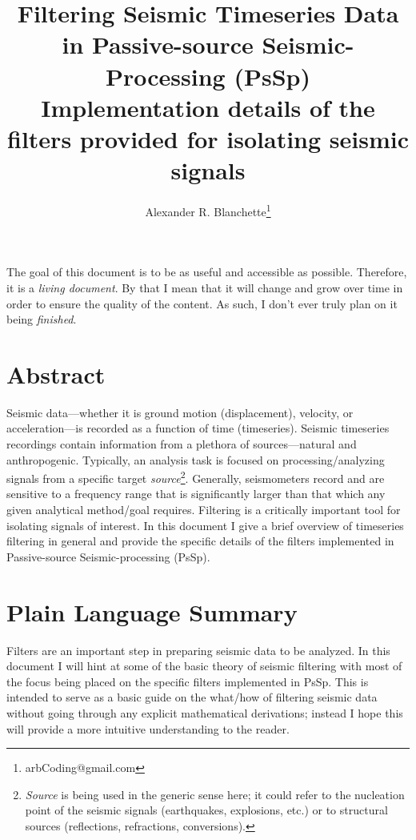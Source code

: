 \documentclass[american, twoside]{article}
\title{\Huge Filtering Seismic Timeseries Data in Passive-source Seismic-Processing (PsSp)\\
\large Implementation details of the filters provided for isolating seismic signals}
\author{Alexander R. Blanchette\thanks{arbCoding@gmail.com}}
\date{\Today}
\begin{document}
\maketitle
\pagestyle{fancy}
\scriptsize The goal of this document is to be as useful and accessible as possible. Therefore, it is a \textit{living document}. By that I mean
that it will change and grow over time in order to ensure the quality of the content. As such, I don't ever truly plan on it being
\textit{finished}.
\normalsize

\begin{tcolorbox}[enhanced]
    \section*{Abstract} \label{Abstract}
    Seismic data---whether it is ground motion (displacement), velocity, or acceleration---is recorded as a function of time (timeseries). Seismic timeseries
    recordings contain information from a plethora of sources---natural and anthropogenic. Typically, an analysis task is focused on processing/analyzing
    signals from a specific target \textit{source}\footnote{\textit{Source} is being used in the generic sense here; it could refer to the nucleation point of the seismic
    signals (earthquakes, explosions, etc.) or to structural sources (reflections, refractions, conversions).}. Generally, seismometers record and are sensitive
    to a frequency range that is significantly larger than that which any given analytical method/goal requires. Filtering is a critically important tool for
    isolating signals of interest. In this document I give a brief overview of timeseries filtering in general and provide the specific details of the filters
    implemented in Passive-source Seismic-processing (PsSp).
    \section*{Plain Language Summary} \label{PlainSummary}
    Filters are an important step in preparing seismic data to be analyzed. In this document I will hint at some of the basic theory of seismic filtering
    with most of the focus being placed on the specific filters implemented in PsSp. This is intended to serve as a basic guide on the what/how of filtering seismic data without going through
    any explicit mathematical derivations; instead I hope this will provide a more intuitive understanding to the reader.
\end{tcolorbox}
\end{document}
